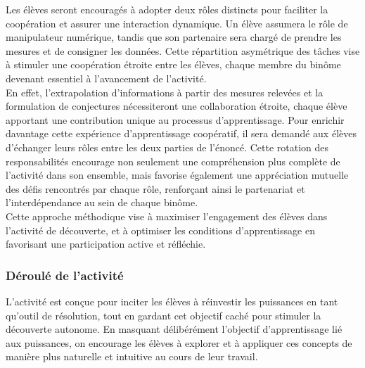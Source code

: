 Les élèves seront encouragés à adopter deux rôles distincts pour faciliter la coopération et assurer une interaction dynamique.
Un élève assumera le rôle de manipulateur numérique,
tandis que son partenaire sera chargé de prendre les mesures et de consigner les données.
Cette répartition asymétrique des tâches vise à stimuler une coopération étroite entre les élèves,
chaque membre du binôme devenant essentiel à l'avancement de l'activité.\\

En effet,
l'extrapolation d'informations à partir des mesures relevées et la formulation de conjectures nécessiteront une collaboration étroite,
chaque élève apportant une contribution unique au processus d'apprentissage.
Pour enrichir davantage cette expérience d'apprentissage coopératif,
il sera demandé aux élèves d'échanger leurs rôles entre les deux parties de l'énoncé.
Cette rotation des responsabilités encourage non seulement une compréhension plus complète de l'activité dans son ensemble,
mais favorise également une appréciation mutuelle des défis rencontrés par chaque rôle,
renforçant ainsi le partenariat et l'interdépendance au sein de chaque binôme.\\

Cette approche méthodique vise à maximiser l'engagement des élèves dans l'activité de découverte,
et à optimiser les conditions d'apprentissage en favorisant une participation active et réfléchie.

\subsubsection{Déroulé de l'activité}

L'activité est conçue pour inciter les élèves à réinvestir les puissances en tant qu'outil de résolution,
tout en gardant cet objectif caché pour stimuler la découverte autonome.
En masquant délibérément l'objectif d'apprentissage lié aux puissances,
on encourage les élèves à explorer et à appliquer ces concepts de manière plus naturelle et intuitive au cours de leur travail.\\

